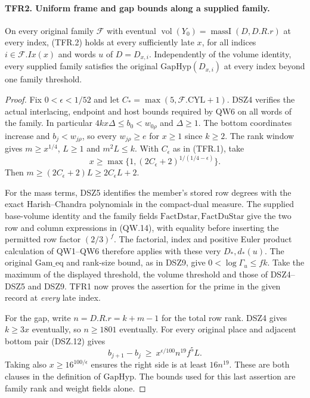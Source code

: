 \paragraph{TFR2. Uniform frame and gap bounds along a supplied family.}
\label{claim:TFR2}
On every original family $\mathcal F$ with eventual
$\operatorname{vol}(Y_0)=\operatorname{massI}(D,D.R.r)$
at every index, (TFR.2) holds at every sufficiently late $x$,
for all indices $i\in\mathcal F.Ix(x)$ and words $u$ of
$D=D_{x,i}$. Independently of the volume identity, every supplied
family satisfies the original $\mathrm{GapHyp}(D_{x,i})$ at
every index beyond one family threshold.

\begin{proof}
Fix $0<\epsilon<1/52$ and let
$C_*=\max(5,\mathcal F.\mathrm{CYL}+1)$. DSZ4 verifies the
actual interlacing, endpoint and host bounds required by QW6 on
all words of the family. In particular
$4kx\Delta\le b_0<w_{0\rho}$ and $\Delta\ge1$.
The bottom coordinates increase and $b_j<w_{j\rho}$, so every
$w_{j\rho}\ge e$ for $x\ge1$ since $k\ge2$.
The rank window gives $m\ge x^{1/4}$, $L\ge1$ and $m^2L\le k$.
With $C_\epsilon$ as in (TFR.1), take
\[
 x\ge \max\{1,(2C_\epsilon+2)^{1/(1/4-\epsilon)}\}.
\]
Then $m\ge (2C_\epsilon+2)L\ge 2C_\epsilon L+2$.

For the mass terms, DSZ5 identifies the member's stored row
degrees with the exact Harish--Chandra polynomials in the
compact-dual measure. The supplied base-volume identity and the
family fields $\mathrm{FactDstar},\mathrm{FactDuStar}$ give
the two row and column expressions in (QW.14), with equality
before inserting the permitted row factor $(2/3)^f$.
The factorial, index and positive Euler product calculation of
QW1--QW6 therefore applies with these very $D_*,d_*(u)$.
The original $\mathrm{Gam\_eq}$ and rank-size bound, as in
DSZ9, give $0<\log\Gamma_u\le fk$. Take the maximum of the
displayed threshold, the volume threshold and those of DSZ4--DSZ5
and DSZ9. TFR1 now proves the assertion for the prime in the given
record at \emph{every} late index.

For the gap, write $n=D.R.r=k+m-1$ for the total row rank.
DSZ4 gives $k\ge3x$ eventually, so $n\ge1801$ eventually.
For every original place and adjacent bottom pair (DSZ.12) gives
\[
 b_{j+1}-b_j\ \ge\ x^{\epsilon/100} n^{19}f^5 L.
\]
Taking also $x\ge16^{100/\epsilon}$ ensures the right side is
at least $16n^{19}$. These are both clauses in the definition of
$\mathrm{GapHyp}$. The bounds used for this last assertion are
family rank and weight fields alone.
\end{proof}

